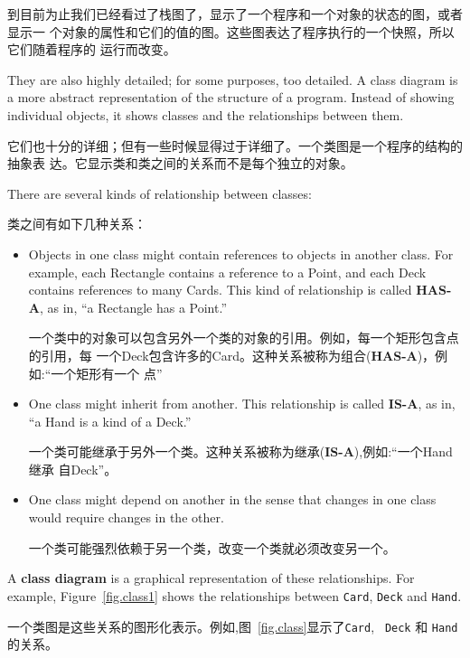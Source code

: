 \documentclass[10pt]{book}
\begin{document}
\begin{CJK}{UTF8}{gbsn}
到目前为止我们已经看过了栈图了，显示了一个程序和一个对象的状态的图，或者显示一
个对象的属性和它们的值的图。这些图表达了程序执行的一个快照，所以它们随着程序的
运行而改变。

They are also highly detailed; for some purposes, too
detailed.  A class diagram is a more abstract representation
of the structure of a program.  Instead of showing individual
objects, it shows classes and the relationships between them.

它们也十分的详细；但有一些时候显得过于详细了。一个类图是一个程序的结构的抽象表
达。它显示类和类之间的关系而不是每个独立的对象。

There are several kinds of relationship between classes:

类之间有如下几种关系：

\begin{itemize}

\item Objects in one class might contain references to objects
in another class.  For example, each Rectangle contains a reference
to a Point, and each Deck contains references to many Cards.
This kind of relationship is called {\bf HAS-A}, as in, ``a Rectangle
has a Point.''

一个类中的对象可以包含另外一个类的对象的引用。例如，每一个矩形包含点的引用，每
一个Deck包含许多的Card。这种关系被称为组合({\bf HAS-A})，例如:``一个矩形有一个
点''

\item One class might inherit from another.  This relationship
is called {\bf IS-A}, as in, ``a Hand is a kind of a Deck.''

一个类可能继承于另外一个类。这种关系被称为继承({\bf IS-A}),例如:``一个Hand继承
自Deck''。

\item One class might depend on another in the sense that changes
in one class would require changes in the other.

一个类可能强烈依赖于另一个类，改变一个类就必须改变另一个。

\end{itemize}

A {\bf class diagram} is a graphical representation of these
relationships.  For example, Figure~\ref{fig.class1} shows the
relationships between {\tt Card}, {\tt Deck} and {\tt Hand}.

一个类图是这些关系的图形化表示。例如,图~\ref{fig.class}显示了{\tt Card}, {\tt
Deck} 和 {\tt Hand}的关系。


\end{CJK}
\end{document}
